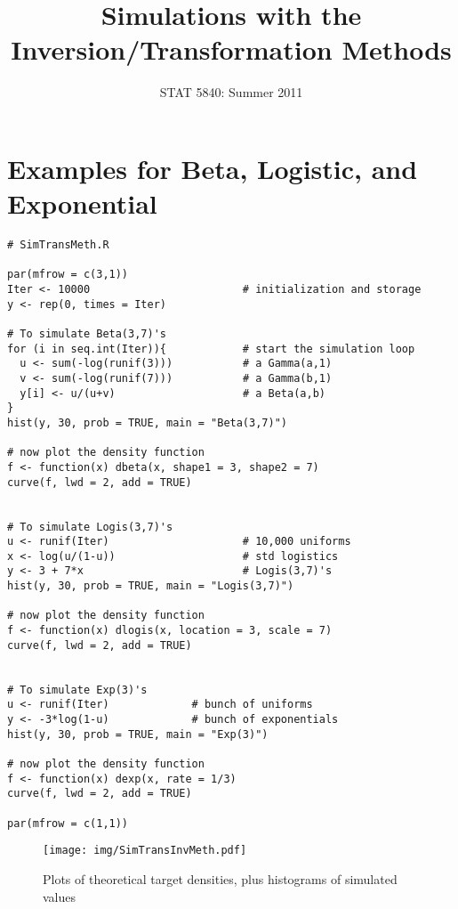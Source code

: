 \documentclass[11pt,english]{article}
\title{Simulations with the Inversion/Transformation Methods}
\date{STAT 5840: Summer 2011}
\begin{document}
\maketitle

\thispagestyle{empty}

\section*{Examples for Beta, Logistic, and Exponential}
\label{sec-1}



\begin{verbatim}
# SimTransMeth.R

par(mfrow = c(3,1))
Iter <- 10000                        # initialization and storage    
y <- rep(0, times = Iter)

# To simulate Beta(3,7)'s 
for (i in seq.int(Iter)){            # start the simulation loop        
  u <- sum(-log(runif(3)))           # a Gamma(a,1)
  v <- sum(-log(runif(7)))           # a Gamma(b,1)
  y[i] <- u/(u+v)                    # a Beta(a,b)
}
hist(y, 30, prob = TRUE, main = "Beta(3,7)")

# now plot the density function
f <- function(x) dbeta(x, shape1 = 3, shape2 = 7)
curve(f, lwd = 2, add = TRUE)


# To simulate Logis(3,7)'s
u <- runif(Iter)                     # 10,000 uniforms
x <- log(u/(1-u))                    # std logistics
y <- 3 + 7*x                         # Logis(3,7)'s
hist(y, 30, prob = TRUE, main = "Logis(3,7)")

# now plot the density function
f <- function(x) dlogis(x, location = 3, scale = 7)
curve(f, lwd = 2, add = TRUE)


# To simulate Exp(3)'s
u <- runif(Iter)             # bunch of uniforms
y <- -3*log(1-u)             # bunch of exponentials
hist(y, 30, prob = TRUE, main = "Exp(3)")

# now plot the density function
f <- function(x) dexp(x, rate = 1/3)
curve(f, lwd = 2, add = TRUE)

par(mfrow = c(1,1))
\end{verbatim}




\begin{figure}[h!]
\centering
\texttt{[image: img/SimTransInvMeth.pdf]}
\caption{\label{fig:yplot}Plots of theoretical target densities, plus histograms of simulated values}
\end{figure}
\end{document}
